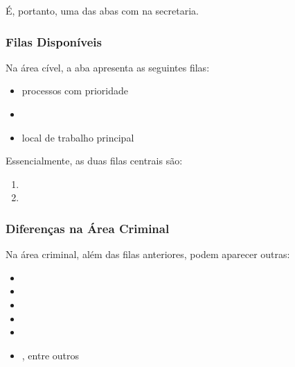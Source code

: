 \documentclass[letterpaper,10pt,brazil]{sphinxmanual}
\begin{document}
\sphinxAtStartPar
É, portanto, uma das abas com  na secretaria.


\subsubsection{Filas Disponíveis}
\label{\detokenize{projud_05_analisejuntada:filas-disponiveis}}
\sphinxAtStartPar
Na área cível, a aba apresenta as seguintes filas:
\begin{itemize}
\item {} 
\sphinxAtStartPar
{} \textendash{} processos com prioridade

\item {} 
\sphinxAtStartPar
{}

\item {} 
\sphinxAtStartPar
{} \textendash{} local de trabalho principal

\end{itemize}

\sphinxAtStartPar
Essencialmente, as duas filas centrais são:
\begin{enumerate}
%
\item {} 
\sphinxAtStartPar
{}

\item {} 
\sphinxAtStartPar
{}

\end{enumerate}


\subsubsection{Diferenças na Área Criminal}
\label{\detokenize{projud_05_analisejuntada:diferencas-na-area-criminal}}
\sphinxAtStartPar
Na área criminal, além das filas anteriores, podem aparecer outras:
\begin{itemize}
\item {} 
\sphinxAtStartPar
{}

\item {} 
\sphinxAtStartPar
{}

\item {} 
\sphinxAtStartPar
{}

\item {} 
\sphinxAtStartPar
{}

\item {} 
\sphinxAtStartPar
{}

\item {} 
\sphinxAtStartPar
{}, entre outros

\end{itemize}
\end{document}
